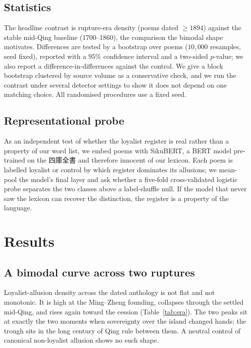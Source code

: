 \documentclass[10pt,twocolumn]{article}
\begin{document}
\subsection{Statistics}
The headline contrast is rupture-era density (poems dated $\geq 1894$) against the stable
mid-Qing baseline (1700--1860), the comparison the bimodal shape motivates. Differences are
tested by a bootstrap over poems ($10{,}000$ resamples, seed fixed), reported with a
$95\%$ confidence interval and a two-sided $p$-value; we also report a
difference-in-differences against the control. We give a block bootstrap clustered by source volume as a
conservative check, and we run the contrast under several detector settings to show it does
not depend on one matching choice. All randomised procedures use a fixed seed.

\subsection{Representational probe}
As an independent test of whether the loyalist register is real rather than a property of our
word list, we embed poems with SikuBERT, a BERT model pre-trained on the \mbox{四庫全書} and
therefore innocent of our lexicon. Each poem is labelled loyalist or control by which
register dominates its allusions; we mean-pool the model's final layer and ask whether a
five-fold cross-validated logistic probe separates the two classes above a label-shuffle
null. If the model that never saw the lexicon can recover the distinction, the register is a
property of the language.

\section{Results}
\subsection{A bimodal curve across two ruptures}
Loyalist-allusion density across the dated anthology is not flat and not monotonic. It is
high at the Ming--Zheng founding, collapses through the settled mid-Qing, and rises again
toward the cession (Table~\ref{tab:era}). The two peaks sit at exactly the two moments when
sovereignty over the island changed hands; the trough sits in the long century of Qing rule
between them. A neutral control of canonical non-loyalist allusion shows no such shape.
\end{document}
